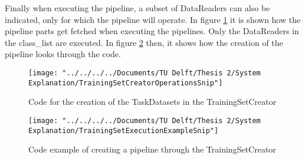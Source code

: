 Finally when executing the pipeline, a subset of DataReaders can also be indicated, only for which the pipeline will operate. In figure \ref{fig:trainingsetcreatoroperationssnip} it is shown how the pipeline parts get fetched when executing the pipelines. Only the DataReaders in the class\_list are executed. In figure \ref{fig:trainingsetexecutionexamplesnip} then, it shows how the creation of the pipeline looks through the code. \\

\begin{figure}
	\centering
	\texttt{[image: "../../../../Documents/TU Delft/Thesis 2/System Explanation/TrainingSetCreatorOperationsSnip"]}
	\caption{Code for the creation of the TaskDatasets in the TrainingSetCreator}
	\label{fig:trainingsetcreatoroperationssnip}
\end{figure}

\begin{figure}
	\centering
	\texttt{[image: "../../../../Documents/TU Delft/Thesis 2/System Explanation/TrainingSetExecutionExampleSnip"]}
	\caption{Code example of creating a pipeline through the TrainingSetCreator}
	\label{fig:trainingsetexecutionexamplesnip}
\end{figure}


